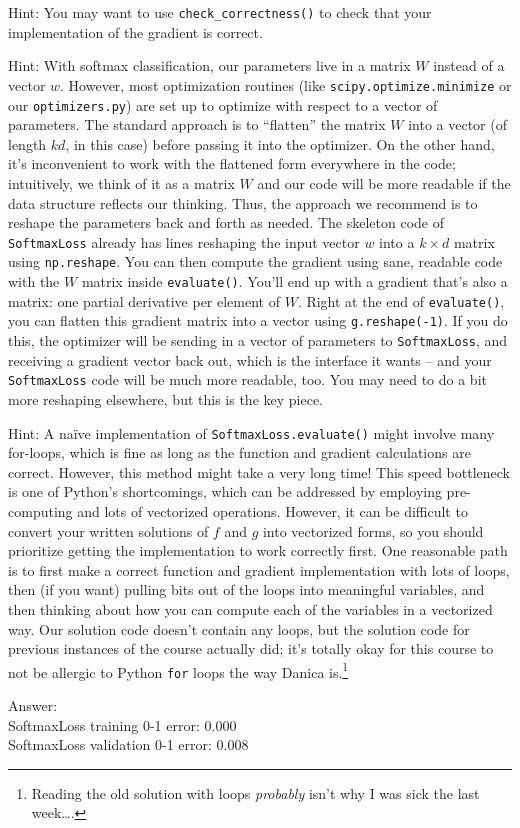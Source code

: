 \documentclass{article}
\newcommand{\gre}[1]{\textcolor{gre}{#1}}
\newcommand\ans[1]{\par\gre{Answer: #1}}
\begin{document}
Hint: You may want to use \verb|check_correctness()| to check that your implementation of the gradient is correct.

Hint: With softmax classification, our parameters live in a matrix $W$ instead of a vector $w$. However, most optimization routines (like \verb|scipy.optimize.minimize| or our \verb|optimizers.py|) are set up to optimize with respect to a vector of parameters. The standard approach is to ``flatten'' the matrix $W$ into a vector (of length $kd$, in this case) before passing it into the optimizer. On the other hand, it's inconvenient to work with the flattened form everywhere in the code; intuitively, we think of it as a matrix $W$ and our code will be more readable if the data structure reflects our thinking. Thus, the approach we recommend is to reshape the parameters back and forth as needed. The skeleton code of \verb|SoftmaxLoss| already has lines reshaping the input vector $w$ into a $k \times d$ matrix using \verb|np.reshape|. You can then compute the gradient using sane, readable code with the $W$ matrix inside \verb|evaluate()|. You'll end up with a gradient that's also a matrix: one partial derivative per element of $W$. Right at the end of \verb|evaluate()|, you can flatten this gradient matrix into a vector using \verb|g.reshape(-1)|. If you do this, the optimizer will be sending in a vector of parameters to \verb|SoftmaxLoss|, and receiving a gradient vector back out, which is the interface it wants -- and your \verb|SoftmaxLoss| code will be much more readable, too. You may need to do a bit more reshaping elsewhere, but this is the key piece.

Hint: A na\"ive implementation of \verb|SoftmaxLoss.evaluate()| might involve many for-loops, which is fine as long as the function and gradient calculations are correct. However, this method might take a very long time! This speed bottleneck is one of Python's shortcomings, which can be addressed by employing pre-computing and lots of vectorized operations. However, it can be difficult to convert your written solutions of $f$ and $g$ into vectorized forms, so you should prioritize getting the implementation to work correctly first. One reasonable path is to first make a correct function and gradient implementation with lots of loops, then (if you want) pulling bits out of the loops into meaningful variables, and then thinking about how you can compute each of the variables in a vectorized way. Our solution code doesn't contain any loops, but the solution code for previous instances of the course actually did; it's totally okay for this course to not be allergic to Python \verb|for| loops the way Danica is.\footnote{Reading the old solution with loops \emph{probably} isn't why I was sick the last week\dots.}
\newpage
\ans{\\
SoftmaxLoss training 0-1 error: 0.000\\
SoftmaxLoss validation 0-1 error: 0.008\\
}
\end{document}
